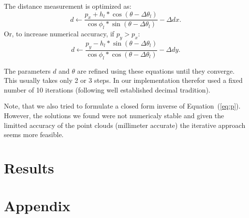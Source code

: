 \documentclass[english]{article}
\begin{document}
The distance measurement is optimized as:
\begin{equation}
    d \leftarrow \frac{p_x + h_l * \cos(\theta - \Delta \theta_l)}{\cos{\phi_l} * \sin(\theta - \Delta \theta_l)} - \Delta dx.  \label{eq:dita}
\end{equation}
Or, to increase numerical accuracy, if $p_y > p_x$:
\begin{equation}
    d \leftarrow \frac{p_y - h_l * \sin(\theta - \Delta \theta_l)}{\cos{\phi_l} * \cos(\theta - \Delta \theta_l)} - \Delta dy.  \label{eq:ditb}
\end{equation}


The parameters $d$ and $\theta$ are refined using these equations until they
converge. This usually takes only 2 or 3 steps. In our implementation therefor
used a fixed number of 10 iterations (following well established decimal
tradition).

Note, that we also tried to formulate a closed form inverse of
Equation~(\ref{eq:p}). However, the solutions we found were not numericaly
stable and given the limitted accuracy of the point clouds (millimeter accurate)
the iterative approach seems more feasible.
\section{Results}




\section*{Appendix}
\end{document}
